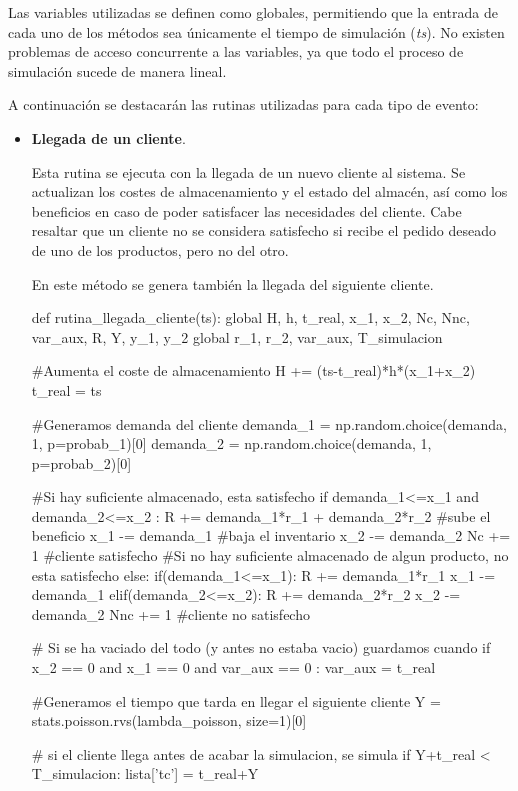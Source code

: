 \documentclass[a4paper,12pt]{article}
\begin{document}
	Las variables utilizadas se definen como globales, permitiendo que la entrada de cada uno de los métodos sea únicamente el tiempo de simulación (\textit{ts}). No existen problemas de acceso concurrente a las variables, ya que todo el proceso de simulación sucede de manera lineal.
	
	A continuación se destacarán las rutinas utilizadas para cada tipo de evento:
	\begin{itemize}
		\item \textbf{Llegada de un cliente}. 
		
		Esta rutina se ejecuta con la llegada de un nuevo cliente al sistema. Se actualizan los costes de almacenamiento y el estado del almacén, así como los beneficios en caso de poder satisfacer las necesidades del cliente. 
		Cabe resaltar que un cliente no se considera satisfecho si recibe el pedido deseado de uno de los productos, pero no del otro.
		
		En este método se genera también la llegada del siguiente cliente.
		
		\begin{python}
def rutina_llegada_cliente(ts):
	global H, h, t_real, x_1, x_2, Nc, Nnc, var_aux, R, Y, y_1, y_2
	global r_1, r_2, var_aux, T_simulacion
	
	#Aumenta el coste de almacenamiento
	H += (ts-t_real)*h*(x_1+x_2)
	t_real = ts

	
	#Generamos demanda del cliente
	demanda_1 = np.random.choice(demanda, 1, p=probab_1)[0]
	demanda_2 = np.random.choice(demanda, 1, p=probab_2)[0]
	
	#Si hay suficiente almacenado, esta satisfecho
	if demanda_1<=x_1 and demanda_2<=x_2 :
		R += demanda_1*r_1 + demanda_2*r_2 #sube el beneficio
		x_1 -= demanda_1	 #baja el inventario
		x_2 -= demanda_2
		Nc += 1 #cliente satisfecho
	#Si no hay suficiente almacenado de algun producto, no esta satisfecho
	else:
		if(demanda_1<=x_1):
			R += demanda_1*r_1
			x_1 -= demanda_1
		elif(demanda_2<=x_2):
			R += demanda_2*r_2
			x_2 -= demanda_2
		Nnc += 1 #cliente no satisfecho
	
	# Si se ha vaciado del todo (y antes no estaba vacio) guardamos cuando
	if x_2 == 0 and x_1 == 0 and var_aux == 0 :
		var_aux = t_real

	
	#Generamos el tiempo que tarda en llegar el siguiente cliente
	Y = stats.poisson.rvs(lambda_poisson, size=1)[0]
	
	# si el cliente llega antes de acabar la simulacion, se simula
	if Y+t_real < T_simulacion:
		lista['tc'] = t_real+Y
		\end{python}
	

\end{itemize}
\end{document}

